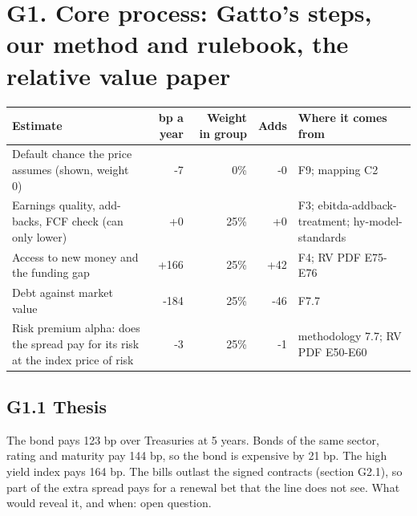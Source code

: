 \documentclass[11pt,a4paper]{article}
\begin{document}
\section*{G1. Core process: Gatto's steps, our method and rulebook, the relative value paper}
\par\noindent{}
\begin{center}\footnotesize\setlength{\tabcolsep}{3.5pt}\begin{tabular}{@{}p{6.2cm}rrrp{4.2cm}@{}}\toprule
Estimate & bp a year & Weight in group & Adds & Where it comes from \\\midrule
Default chance the price assumes (shown, weight 0) & -7 & 0\% & -0 & F9; mapping C2 \\
Earnings quality, add-backs, FCF check (can only lower) & +0 & 25\% & +0 & F3; ebitda-addback-treatment; hy-model-standards \\
Access to new money and the funding gap & +166 & 25\% & +42 & F4; RV PDF E75-E76 \\
Debt against market value & -184 & 25\% & -46 & F7.7 \\
Risk premium alpha: does the spread pay for its risk at the index price of risk & -3 & 25\% & -1 & methodology 7.7; RV PDF E50-E60 \\
\bottomrule\end{tabular}\end{center}
\subsection*{G1.1 Thesis}
The bond pays 123 bp over Treasuries at 5 years. Bonds of the same sector, rating and maturity pay 144 bp, so the bond is expensive by 21 bp. The high yield index pays 164 bp. The bills outlast the signed contracts (section G2.1), so part of the extra spread pays for a renewal bet that the line does not see. What would reveal it, and when: open question.
\end{document}
